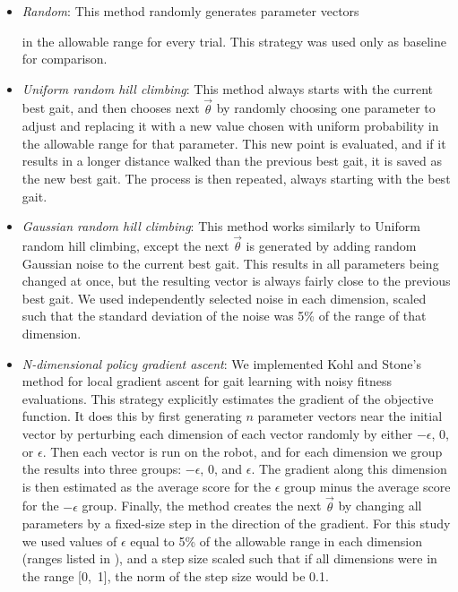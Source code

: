 

\begin{itemize}

\item \emph{Random}: This method randomly generates parameter vectors

  in the allowable range for every trial.  This strategy was used only
  as baseline for comparison.

\item \emph{Uniform random hill climbing}: This method always starts
  with the current best gait, and then chooses next $\vec{\theta}$ by
  randomly choosing one parameter to adjust and replacing it with a
  new value chosen with uniform probability in the allowable range for
  that parameter. This new point is evaluated, and if it results in a
  longer distance walked than the previous best gait, it is saved as
  the new best gait. The process is then repeated, always starting
  with the best gait.

\item \emph{Gaussian random hill climbing}: This method works
  similarly to Uniform random hill climbing, except the next
  $\vec{\theta}$ is generated by adding random Gaussian noise to the
  current best gait.  This results in all parameters being changed at
  once, but the resulting vector is always fairly close to the
  previous best gait.  We used independently selected noise in each
  dimension, scaled such that the standard deviation of the noise was
  5\% of the range of that dimension.

\item \emph{N-dimensional policy gradient ascent}: We implemented Kohl
  and Stone's \cite{kohl} method for local gradient ascent for gait
  learning with noisy fitness evaluations. This strategy explicitly
  estimates the gradient of the objective function. It does this by
  first generating $n$ parameter vectors near the initial vector by
  perturbing each dimension of each vector randomly by either
  $-\epsilon$, $0$, or $\epsilon$. Then each vector is run on the
  robot, and for each dimension we group the results into three
  groups: $-\epsilon$, $0$, and $\epsilon$.  The gradient along this
  dimension is then estimated as the average score for the $\epsilon$
  group minus the average score for the $-\epsilon$ group. Finally,
  the method creates the next $\vec{\theta}$ by changing all
  parameters by a fixed-size step in the direction of the gradient.
  For this study we used values of $\epsilon$ equal to 5\% of the
  allowable range in each dimension (ranges listed in
  ), and a step size scaled such that if all dimensions
  were in the range [0,~1], the norm of the step size would be 0.1.


\end{itemize}
